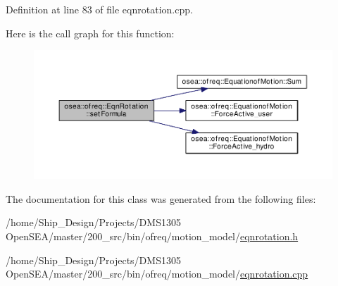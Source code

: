Definition at line 83 of file eqnrotation.\-cpp.



Here is the call graph for this function\-:\nopagebreak
\begin{figure}[H]
\begin{center}
\leavevmode
\includegraphics[width=350pt]{classosea_1_1ofreq_1_1_eqn_rotation_a910975e9e2e8d438853a4e7d658850a8_cgraph}
\end{center}
\end{figure}




The documentation for this class was generated from the following files\-:\begin{DoxyCompactItemize}
\item 
/home/\-Ship\-\_\-\-Design/\-Projects/\-D\-M\-S1305 Open\-S\-E\-A/master/200\-\_\-src/bin/ofreq/motion\-\_\-model/\hyperlink{eqnrotation_8h}{eqnrotation.\-h}\item 
/home/\-Ship\-\_\-\-Design/\-Projects/\-D\-M\-S1305 Open\-S\-E\-A/master/200\-\_\-src/bin/ofreq/motion\-\_\-model/\hyperlink{eqnrotation_8cpp}{eqnrotation.\-cpp}\end{DoxyCompactItemize}
